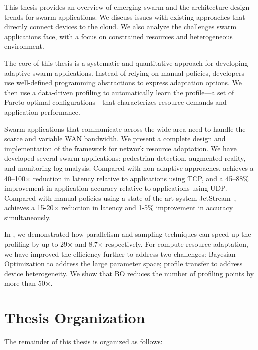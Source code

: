 \documentclass[thesis.tex]{subfiles}
\begin{document}
 This thesis provides an overview of
emerging swarm and the architecture design trends for swarm applications. We
discuss issues with existing approaches that directly connect devices to the
cloud. We also analyze the challenges swarm applications face, with a focus on
constrained resources and heterogeneous environment.

 The core of this thesis is a
systematic and quantitative approach for developing adaptive swarm
applications. Instead of relying on manual policies, developers use well-defined
programming abstractions to express adaptation options. We then use a
data-driven profiling to automatically learn the profile---a set of
Pareto-optimal configurations---that characterizes resource demands and
application performance.

 Swarm applications
that communicate across the wide area need to handle the scarce and variable WAN
bandwidth. We present a complete design and implementation of the framework
\awstream{} for network resource adaptation. We have developed several swarm
applications: pedestrian detection, augmented reality, and monitoring log
analysis. Compared with non-adaptive approaches, \awstream{} achieves a
40--100$\times$ reduction in latency relative to applications using TCP, and a
45--88\% improvement in application accuracy relative to applications using
UDP. Compared with manual policies using a state-of-the-art system
JetStream~\cite{rabkin2014aggregation}, \awstream{} achieves a 15-20$\times$
reduction in latency and 1-5\% improvement in accuracy simultaneously.

 In \awstream{}, we demonstrated how
parallelism and sampling techniques can speed up the profiling by up to
29$\times$ and 8.7$\times$ respectively. For compute resource adaptation, we
have improved the efficiency further to address two challenges: Bayesian
Optimization to address the large parameter space; profile transfer to address
device heterogeneity. We show that BO reduces the number of profiling points by
more than 50$\times$.

\section{Thesis Organization}
\label{sec:thesis-organization}

The remainder of this thesis is organized as follows:
\end{document}
